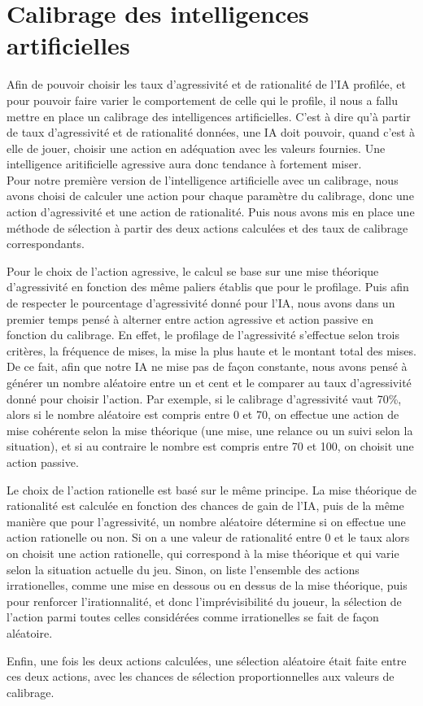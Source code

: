 \documentclass{report}
\begin{document}
\section{Calibrage des intelligences artificielles}

\hspace{0.5cm}Afin de pouvoir choisir les taux d'agressivité et de rationalité de l'IA profilée, et pour pouvoir faire varier le comportement de celle qui le profile, il nous a fallu mettre en place un calibrage des intelligences artificielles. C'est à dire qu'à partir de taux d'agressivité et de rationalité données, une IA doit pouvoir, quand c'est à elle de jouer, choisir une action en adéquation avec les valeurs fournies. Une intelligence aritificielle agressive aura donc tendance à fortement miser.\\

Pour notre première version de l'intelligence artificielle avec un calibrage, nous avons choisi de calculer une action pour chaque paramètre du calibrage, donc une action d'agressivité et une action de rationalité. Puis nous avons mis en place une méthode de sélection à partir des deux actions calculées et des taux de calibrage correspondants.\par
Pour le choix de l'action agressive, le calcul se base sur une mise théorique d'agressivité en fonction des même paliers établis que pour le profilage. Puis afin de respecter le pourcentage d'agressivité donné pour l'IA, nous avons dans un premier temps pensé à alterner entre action agressive et action passive en fonction du calibrage. En effet, le profilage de l'agressivité s'effectue selon trois critères, la fréquence de mises, la mise la plus haute et le montant total des mises. De ce fait, afin que notre IA ne mise pas de façon constante, nous avons pensé à générer un nombre aléatoire entre un et cent et le comparer au taux d'agressivité donné pour choisir l'action. Par exemple, si le calibrage d'agressivité vaut 70\%, alors si le nombre aléatoire est compris entre 0 et 70, on effectue une action de mise cohérente selon la mise théorique (une mise, une relance ou un suivi selon la situation), et si au contraire le nombre est compris entre 70 et 100, on choisit une action passive.\par
Le choix de l'action rationelle est basé sur le même principe. La mise théorique de rationalité est calculée en fonction des chances de gain de l'IA, puis de la même manière que pour l'agressivité, un nombre aléatoire détermine si on effectue une action rationelle ou non. Si on a une valeur de rationalité entre 0 et le taux alors on choisit une action rationelle, qui correspond à la mise théorique et qui varie selon la situation actuelle du jeu. Sinon, on liste l'ensemble des actions irrationelles, comme une mise en dessous ou en dessus de la mise théorique, puis pour renforcer l'irationnalité, et donc l'imprévisibilité du joueur, la sélection de l'action parmi toutes celles considérées comme irrationelles se fait de façon aléatoire.\par
Enfin, une fois les deux actions calculées, une sélection aléatoire était faite entre ces deux actions, avec les chances de sélection proportionnelles aux valeurs de calibrage.\\
\end{document}
